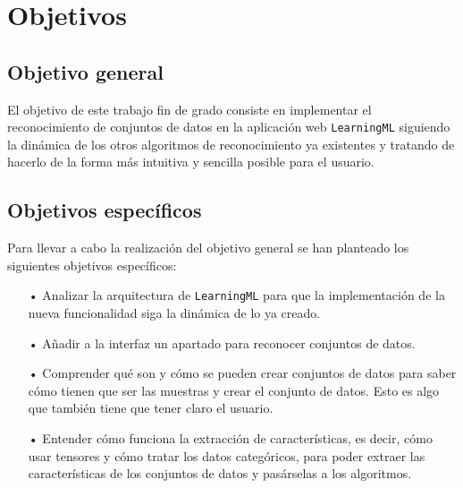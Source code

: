 \documentclass[a4paper, 12pt]{book}
\begin{document}
\cleardoublepage %
\chapter{Objetivos} %
\label{chap:objetivos} %

\section{Objetivo general} %
\label{sec:objetivo-general} %

El objetivo de este trabajo fin de grado consiste en implementar el reconocimiento de conjuntos de datos en la aplicación web \texttt{LearningML} siguiendo la dinámica de los otros algoritmos de reconocimiento ya existentes y tratando de hacerlo de la forma más intuitiva y sencilla posible para el usuario.


\section{Objetivos específicos}
\label{sec:objetivos-especificos}

Para llevar a cabo la realización del objetivo general se han planteado los siguientes objetivos específicos:

\begin{itemize}

\item[•] Analizar la arquitectura de \texttt{LearningML} para que la implementación de la nueva funcionalidad siga la dinámica de lo ya creado.

\item[•] Añadir a la interfaz un apartado para reconocer conjuntos de datos.

\item[•] Comprender qué son y cómo se pueden crear conjuntos de datos para saber cómo tienen que ser las muestras y crear el conjunto de datos. Esto es algo que también tiene que tener claro el usuario.

\item[•] Entender cómo funciona la extracción de características, es decir, cómo usar tensores y cómo tratar los datos categóricos, para poder extraer las características de los conjuntos de datos y pasárselas a los algoritmos.

\end{itemize}
\end{document}
